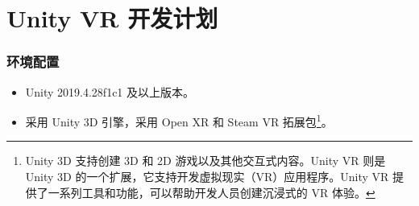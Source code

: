 \documentclass[letterpaper,10pt]{article}
\begin{document}
		
%				
%				
%				
%				
%				
%				
	
	\part{Unity VR 开发计划}
	
		\section{环境配置}

		\begin{itemize}
			\item [(1)] 
			Unity 2019.4.28f1c1 及以上版本。
			
			\item [(2)]
			采用 Unity 3D 引擎，采用 Open XR 和 Steam VR 拓展包\footnote{Unity 3D 支持创建 3D 和 2D 游戏以及其他交互式内容。Unity VR 则是 Unity 3D 的一个扩展，它支持开发虚拟现实（VR）应用程序。Unity VR 提供了一系列工具和功能，可以帮助开发人员创建沉浸式的 VR 体验。}。
		\end{itemize}
\end{document}

